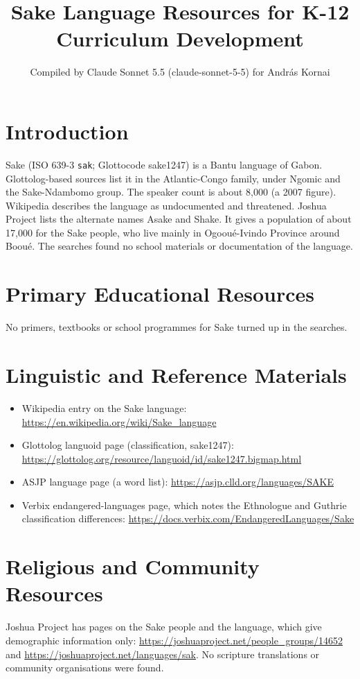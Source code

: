 \documentclass[12pt]{article}
\title{Sake Language Resources for K-12 Curriculum Development}
\author{Compiled by Claude Sonnet 5.5 (claude-sonnet-5-5) for Andr\'as Kornai}
\date{}
\begin{document}
\maketitle

\section{Introduction}
Sake (ISO 639-3 \texttt{sak}; Glottocode sake1247) is a Bantu language of Gabon. Glottolog-based sources list it in the Atlantic-Congo family, under Ngomic and the Sake-Ndambomo group. The speaker count is about 8,000 (a 2007 figure). Wikipedia describes the language as undocumented and threatened. Joshua Project lists the alternate names Asake and Shake. It gives a population of about 17,000 for the Sake people, who live mainly in Ogoou\'e-Ivindo Province around Boou\'e. The searches found no school materials or documentation of the language.

\section{Primary Educational Resources}
No primers, textbooks or school programmes for Sake turned up in the searches.

\section{Linguistic and Reference Materials}
\begin{itemize}
\item Wikipedia entry on the Sake language: \url{https://en.wikipedia.org/wiki/Sake_language}
\item Glottolog languoid page (classification, sake1247): \url{https://glottolog.org/resource/languoid/id/sake1247.bigmap.html}
\item ASJP language page (a word list): \url{https://asjp.clld.org/languages/SAKE}
\item Verbix endangered-languages page, which notes the Ethnologue and Guthrie classification differences: \url{https://docs.verbix.com/EndangeredLanguages/Sake}
\end{itemize}

\section{Religious and Community Resources}
Joshua Project has pages on the Sake people and the language, which give demographic information only: \url{https://joshuaproject.net/people_groups/14652} and \url{https://joshuaproject.net/languages/sak}. No scripture translations or community organisations were found.
\end{document}
